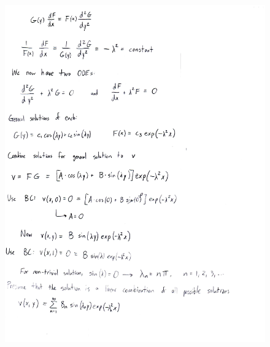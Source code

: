 \documentclass[10pt]{article}
\begin{document}
\begin{figure}[H]
	\begin{center}
		\includegraphics[width=16cm]{app2_p2.jpg}
	\end{center}
\end{figure}
\pagebreak
\end{document}
